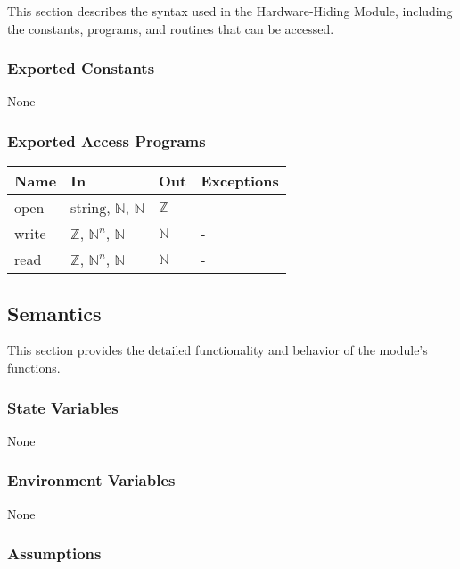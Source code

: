 \documentclass[12pt, titlepage]{article}
\begin{document}
This section describes the syntax used in the Hardware-Hiding Module, including
the constants, programs, and routines that can be accessed.

\subsubsection{Exported Constants}

None

\subsubsection{Exported Access Programs}

\begin{center}
\begin{tabular}{p{2cm} p{4cm} p{4cm} p{2cm}}
\hline
\textbf{Name} & \textbf{In} & \textbf{Out} & \textbf{Exceptions} \\
\hline
open & $\text{string}$, $\mathbb{N}$, $\mathbb{N}$ & $\mathbb{Z}$ & - \\
write & $\mathbb{Z}$, $\mathbb{N}^n$, $\mathbb{N}$ & $\mathbb{N}$ & - \\
read & $\mathbb{Z}$, $\mathbb{N}^n$, $\mathbb{N}$ & $\mathbb{N}$ & - \\
\hline
\end{tabular}
\end{center}

\subsection{Semantics}

This section provides the detailed functionality and behavior of the module’s
functions.

\subsubsection{State Variables}

None

\subsubsection{Environment Variables}

None

\subsubsection{Assumptions}
\end{document}
